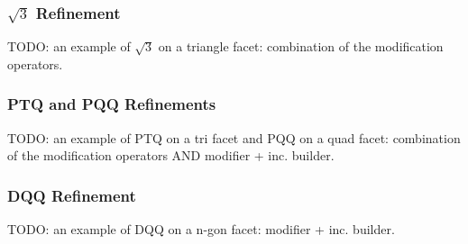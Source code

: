 \subsubsection{$\sqrt{3}$ Refinement}
TODO: an example of $\sqrt{3}$ on a triangle facet: combination 
of the modification operators.


\subsubsection{PTQ and PQQ Refinements}
TODO: an example of PTQ on a tri facet and PQQ on a quad facet:
combination of the modification operators AND modifier + inc. builder.


\subsubsection{DQQ Refinement}
TODO: an example of DQQ on a n-gon facet: modifier + inc. builder.
